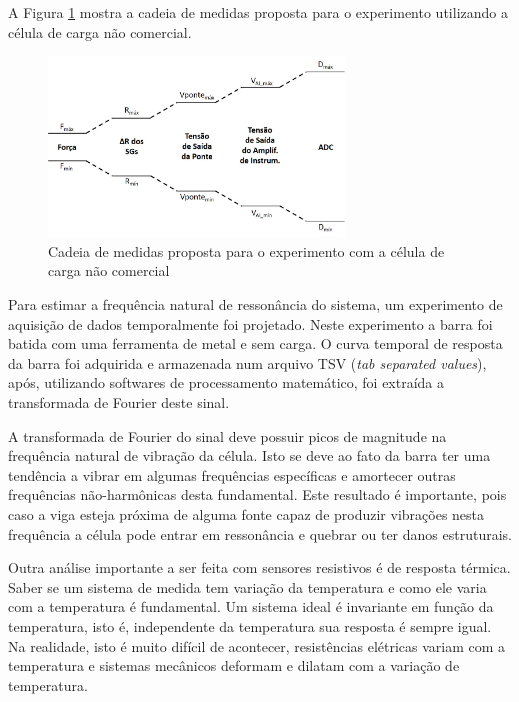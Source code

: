 \documentclass[a4paper]{instrumentacao}
\begin{document}
A Figura \ref{fig:celula-nao-comercial-cadeia-medidas} mostra a cadeia de medidas proposta para o experimento utilizando a célula de carga não comercial.

\begin{figure}[H]
\center
\includegraphics[width=0.7\textwidth]{CadeiaMedidasProposta_Celula.jpg}
\caption{Cadeia de medidas proposta para o experimento com a célula de carga não comercial}
\label{fig:celula-nao-comercial-cadeia-medidas}
\end{figure}

Para estimar a frequência natural de ressonância do sistema, um experimento de aquisição de dados temporalmente foi projetado. Neste experimento a barra foi batida com uma ferramenta de metal e sem carga. O curva temporal de resposta da barra foi adquirida e armazenada num arquivo TSV (\textit{tab separated values}), após, utilizando softwares de processamento matemático, foi extraída a transformada de Fourier deste sinal.

A transformada de Fourier do sinal deve possuir picos de magnitude na frequência natural de vibração da célula. Isto se deve ao fato da barra ter uma tendência a vibrar em algumas frequências específicas e amortecer outras frequências não-harmônicas desta fundamental. Este resultado é importante, pois caso a viga esteja próxima de alguma fonte capaz de produzir vibrações nesta frequência a célula pode entrar em ressonância e quebrar ou ter danos estruturais.

Outra análise importante a ser feita com sensores resistivos é de resposta térmica. Saber se um sistema de medida tem variação da temperatura e como ele varia com a temperatura é fundamental. Um sistema ideal é invariante em função da temperatura, isto é, independente da temperatura sua resposta é sempre igual. Na realidade, isto é muito difícil de acontecer, resistências elétricas variam com a temperatura e sistemas mecânicos deformam e dilatam com a variação de temperatura.
\end{document}
